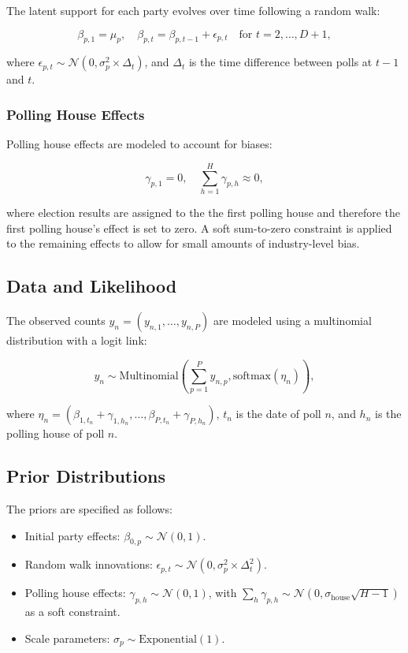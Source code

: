 \documentclass[
  letterpaper,
  DIV=11,
  numbers=noendperiod]{scrartcl}
\providecommand{\tightlist}{%
  \setlength{\itemsep}{0pt}\setlength{\parskip}{0pt}}\usepackage{longtable,booktabs,array}
\begin{document}
The latent support for each party evolves over time following a random
walk:

\[
\beta_{p,1} = \mu_{p}, \quad \beta_{p,t} = \beta_{p,t-1} + \epsilon_{p,t} \quad \text{for } t = 2, \dots, D+1,
\]

where
\(\epsilon_{p,t} \sim \mathcal{N}(0, \sigma_p^2 \times \Delta_t)\), and
\(\Delta_t\) is the time difference between polls at \(t-1\) and \(t\).

\subsubsection{Polling House Effects}\label{polling-house-effects}

Polling house effects are modeled to account for biases:

\[
\gamma_{p,1} = 0, \quad \sum_{h=1}^{H} \gamma_{p,h} \approx 0,
\]

where election results are assigned to the the first polling house and
therefore the first polling house's effect is set to zero. A soft
sum-to-zero constraint is applied to the remaining effects to allow for
small amounts of industry-level bias.

\subsection{Data and Likelihood}\label{data-and-likelihood}

The observed counts \(y_{n} = (y_{n,1}, \dots, y_{n,P})\) are modeled
using a multinomial distribution with a logit link:

\[
y_{n} \sim \text{Multinomial}\left(  \sum_{p=1}^P y_{n, p}, \text{softmax}\left( \eta_{n} \right) \right),
\]

where
\(\eta_{n} = (\beta_{1, t_n} + \gamma_{1, h_n}, \dots, \beta_{P, t_n} + \gamma_{P, h_n})\),
\(t_n\) is the date of poll \(n\), and \(h_n\) is the polling house of
poll \(n\).

\subsection{Prior Distributions}\label{prior-distributions}

The priors are specified as follows:

\begin{itemize}
\tightlist
\item
  Initial party effects: \(\beta_{0,p} \sim \mathcal{N}(0, 1)\).
\item
  Random walk innovations:
  \(\epsilon_{p,t} \sim \mathcal{N}(0, \sigma_p^2 \times \Delta_t^2)\).
\item
  Polling house effects: \(\gamma_{p,h} \sim \mathcal{N}(0, 1)\), with
  \(\sum_{h} \gamma_{p,h} \sim \mathcal{N}(0, \sigma_{\text{house}} \sqrt{H - 1})\)
  as a soft constraint.
\item
  Scale parameters: \(\sigma_p \sim \text{Exponential}(1)\).
\end{itemize}
\end{document}
